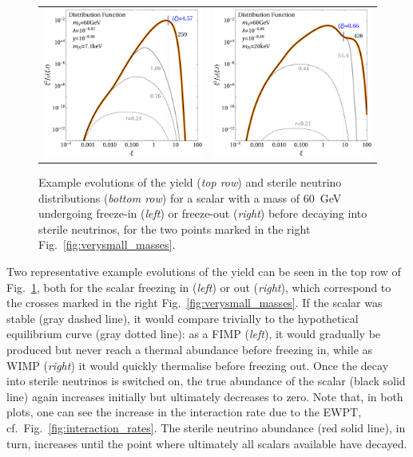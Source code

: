 \begin{figure}[t!]
\begin{tabular}{cc}
 \hspace{-1cm}\includegraphics[width=8.3cm]{figures/snapshots60FIMP.pdf} & \includegraphics[width=8.3cm]{figures/snapshots60WIMP.pdf}
\end{tabular}
\caption{\label{fig:FIMP_WIMP_60}Example evolutions of the yield (\emph{top row}) and sterile neutrino distributions (\emph{bottom row}) for a scalar with a mass of $60$~GeV undergoing freeze-in (\emph{left}) or freeze-out (\emph{right}) before decaying into sterile neutrinos, for the two points marked in the right Fig.~\ref{fig:verysmall_masses}.}
\end{figure}

Two representative example evolutions of the yield can be seen in the top row of Fig.~\ref{fig:FIMP_WIMP_60}, both for the scalar freezing in (\emph{left}) or out (\emph{right}), which correspond to the crosses marked in the right Fig.~\ref{fig:verysmall_masses}. If the scalar was stable (gray dashed line), it would compare trivially to the hypothetical equilibrium curve (gray dotted line): as a FIMP (\emph{left}), it would gradually be produced but never reach a thermal abundance before freezing in, while as WIMP (\emph{right}) it would quickly thermalise before freezing out. Once the decay into sterile neutrinos is switched on, the true abundance of the scalar (black solid line) again increases initially but ultimately decreases to zero. Note that, in both plots, one can see the increase in the interaction rate due to the EWPT, cf.\ Fig.~\ref{fig:interaction_rates}. The sterile neutrino abundance (red solid line), in turn, increases until the point where ultimately all scalars available have decayed.

